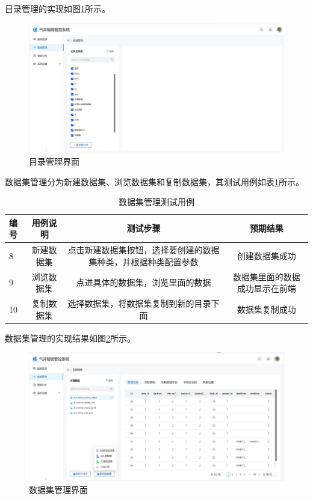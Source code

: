 目录管理的实现如图\ref{fig:dirre}所示。

\begin{figure}
    \renewcommand{\arraystretch}{1.5}
    \centering
    \includegraphics{figure/目录管理.pdf}
    \caption{目录管理界面}
    \label{fig:dirre}
\end{figure}

数据集管理分为新建数据集、浏览数据集和复制数据集，其测试用例如表\ref{tab:dasette}所示。

\begin{table}
    \renewcommand{\arraystretch}{1.5}
    \centering
    \caption{数据集管理测试用例}
    \label{tab:dasette}
    \begin{tabular}{|l|c|c|c|}
        \hline
        编号 & 用例说明 & 测试步骤 &预期结果 \\
        \hline
        8 & 新建数据集 & 点击新建数据集按钮，选择要创建的数据集种类，并根据种类配置参数 & 创建数据集成功 \\
        \hline
        9 & 浏览数据集 & 点进具体的数据集，浏览里面的数据 & 数据集里面的数据成功显示在前端 \\
        \hline
        10 & 复制数据集 & 选择数据集，将数据集复制到新的目录下面 & 数据集复制成功 \\
        \hline
    \end{tabular}
\end{table}

数据集管理的实现结果如图\ref{fig:dasetre}所示。

\begin{figure}
    \centering
    \includegraphics{figure/数据集管理.pdf}
    \caption{数据集管理界面}
    \label{fig:dasetre}
\end{figure}


